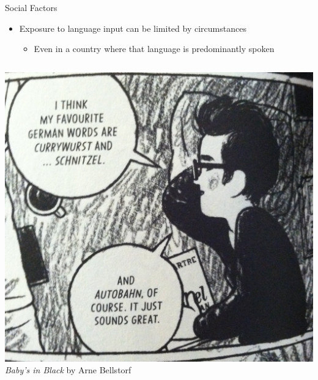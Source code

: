 \documentclass{beamer}
\begin{document}
\begin{frame}{Social Factors} %
  \begin{itemize}
    \item Exposure to language input can be limited by circumstances
    \begin{itemize}
      \item Even in a country where that language is predominantly spoken
    \end{itemize}
  \end{itemize}
  \begin{columns}
      \includegraphics[scale=0.07]{currywurst_cropped.JPG} \\
      \tiny{\textit{Baby's in Black} by Arne Bellstorf}

\end{columns}
\end{frame}
\end{document}
